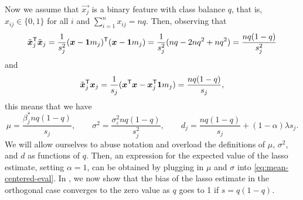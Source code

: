 Now we assume that \(\vec{x_j}\) is a binary feature with class balance \(q\), that is, \(x_{ij} \in \{0, 1\}\) for all \(i\) and \(\sum_{i=1}^n x_{ij} = nq\). Then, observing that
\[
  \tilde{\boldsymbol{x}}_j^{\mathsf{T}} \tilde{\boldsymbol{x}}_j = \frac{1}{s_j^2}(\boldsymbol{x} - \boldsymbol{1} m_j)^{\mathsf{T}} (\boldsymbol{x} - \boldsymbol{1} m_j) = \frac{1}{s^2_j}(nq - 2nq^2 + nq^2) = \frac{nq(1-q)}{s^2_j}
\]
and
\[
  \tilde{\boldsymbol{x}}_j^{\mathsf{T}} \boldsymbol{x}_j = \frac{1}{s_j}(\boldsymbol{x}^{\mathsf{T}} \boldsymbol{x} - \boldsymbol{x}_j^{\mathsf{T}} \boldsymbol{1} m_j) = \frac{nq(1 - q)}{s_j},
\]
this means that we have
\[
  \mu = \frac{\beta^*_j nq(1 - q)}{s_j}, \qquad \sigma^2 = \frac{\sigma_\varepsilon^2nq(1 - q)}{s^2_j}, \qquad d_j = \frac{nq(1 -q)}{s_j}  + (1-\alpha)\lambda s_j.
\]
We will allow ourselves to abuse notation and overload the definitions of \(\mu\), \(\sigma^2\), and \(d\) as functions of \(q\). Then, an expression for the expected value of the lasso estimate, setting \(\alpha = 1\), can be obtained by plugging in \(\mu\) and \(\sigma\) into \eqref{eq:mean-centered-eval}. In , we now show that the bias of the lasso estimate in the orthogonal case converges to the zero value as \(q\) goes to 1 if \(s = q(1-q)\).

